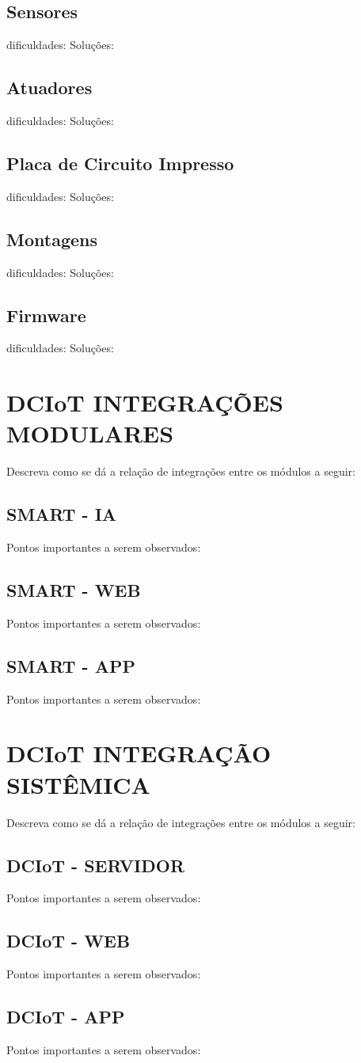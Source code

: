 \subsection{Sensores}
dificuldades:
Soluções:


\subsection{Atuadores}
dificuldades:
Soluções:


\subsection{Placa de Circuito Impresso}
dificuldades:
Soluções:


\subsection{Montagens}
dificuldades:
Soluções:


\subsection{Firmware}
dificuldades:
Soluções:


\section{DCIoT INTEGRAÇÕES MODULARES}

Descreva como se dá a relação de integrações entre os módulos a seguir:

\subsection{SMART - IA}
Pontos importantes a serem observados:

\subsection{SMART - WEB}
Pontos importantes a serem observados:

\subsection{SMART - APP}
Pontos importantes a serem observados:

\section{DCIoT INTEGRAÇÃO SISTÊMICA}
Descreva como se dá a relação de integrações entre os módulos a seguir:

\subsection{DCIoT - SERVIDOR}
Pontos importantes a serem observados:

\subsection{DCIoT - WEB}
Pontos importantes a serem observados:

\subsection{DCIoT - APP}
Pontos importantes a serem observados:







